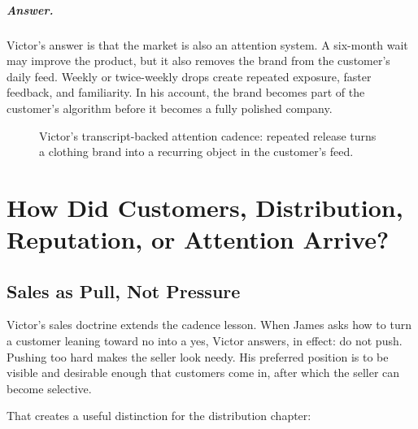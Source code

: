 \documentclass[11pt,oneside]{book}
\begin{document}
\paragraph{Answer.}
Victor's answer is that the market is also an attention system. A six-month wait may improve the product, but it also removes the brand from the customer's daily feed. Weekly or twice-weekly drops create repeated exposure, faster feedback, and familiarity. In his account, the brand becomes part of the customer's algorithm before it becomes a fully polished company.

\begin{figure}[h]
\centering
{}
\caption{Victor's transcript-backed attention cadence: repeated release turns a clothing brand into a recurring object in the customer's feed.}
\end{figure}

\chapter{How Did Customers, Distribution, Reputation, or Attention Arrive?}

\section{Sales as Pull, Not Pressure}

Victor's sales doctrine extends the cadence lesson. When James asks how to turn a customer leaning toward no into a yes, Victor answers, in effect: do not push. Pushing too hard makes the seller look needy. His preferred position is to be visible and desirable enough that customers come in, after which the seller can become selective.

That creates a useful distinction for the distribution chapter:
\end{document}
